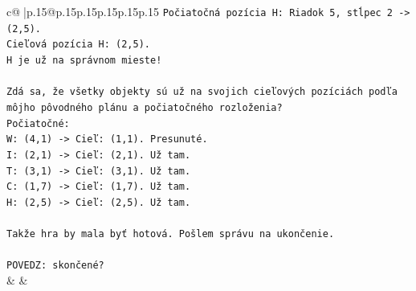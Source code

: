 \documentclass{article}
\begin{document}
{\begin{supertabular}{c@{$\;$}|p{.15\linewidth}@{}p{.15\linewidth}p{.15\linewidth}p{.15\linewidth}p{.15\linewidth}p{.15\linewidth}}
{{{\texttt{Počiatočná pozícia H: Riadok 5, stĺpec 2 {-}> (2,5).} \\
\texttt{Cieľová pozícia H: (2,5).} \\
\texttt{H je už na správnom mieste!} \\
\\ 
\texttt{Zdá sa, že všetky objekty sú už na svojich cieľových pozíciách podľa môjho pôvodného plánu a počiatočného rozloženia?} \\
\texttt{Počiatočné:} \\
\texttt{W: (4,1) {-}> Cieľ: (1,1). Presunuté.} \\
\texttt{I: (2,1) {-}> Cieľ: (2,1). Už tam.} \\
\texttt{T: (3,1) {-}> Cieľ: (3,1). Už tam.} \\
\texttt{C: (1,7) {-}> Cieľ: (1,7). Už tam.} \\
\texttt{H: (2,5) {-}> Cieľ: (2,5). Už tam.} \\
\\ 
\texttt{Takže hra by mala byť hotová. Pošlem správu na ukončenie.} \\
\\ 
\texttt{POVEDZ: skončené?} \\
            }
        }
    }
    & & \\ \\


\end{supertabular}}
\end{document}
